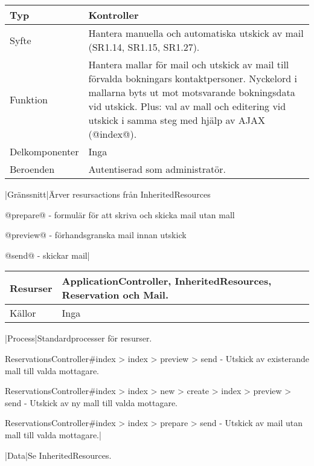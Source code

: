 \documentclass[a4paper, twoside, 11pt, titlepage]{article}
\begin{document}
			\begin {table} [ht] \begin{tabular} {  p{3.5cm} p{9.6cm} }
				\hline
				Typ & Kontroller  \\
				\hline
				Syfte & Hantera manuella och automatiska utskick av mail (SR1.14, SR1.15, SR1.27).  \\
				\hline
				Funktion & Hantera mallar för mail och utskick av mail till förvalda bokningars kontaktpersoner. Nyckelord i mallarna byts ut mot motsvarande bokningsdata vid utskick. Plus: val av mall och editering vid utskick i samma steg med hjälp av AJAX (@index@).  \\
				\hline
				Delkomponenter & Inga  \\
				\hline
				Beroenden & Autentiserad som administratör.  \\
				\hline
			\end{tabular} \end{table} \FloatBarrier
			\vspace{6mm}

			|Gränssnitt|Ärver resursactions från InheritedResources

			@prepare@ - formulär för att skriva och skicka mail utan mall

			@preview@ - förhandsgranska mail innan utskick

			@send@ - skickar mail|

			\begin {table} [ht] \begin{tabular} {  p{3.5cm} p{9.6cm} }
				\hline
				Resurser & ApplicationController, InheritedResources, Reservation och Mail.  \\
				\hline
				Källor & Inga  \\
				\hline
			\end{tabular} \end{table} \FloatBarrier
			\vspace{6mm}

			|Process|Standardprocesser för resurser.

			ReservationsController\#index > index > preview > send - Utskick av existerande mall till valda mottagare.

			ReservationsController\#index > index > new > create > index > preview > send - Utskick av ny mall till valda mottagare.

			ReservationsController\#index > index > prepare > send - Utskick av mail utan mall till valda mottagare.|

			|Data|Se InheritedResources.
\end{document}
